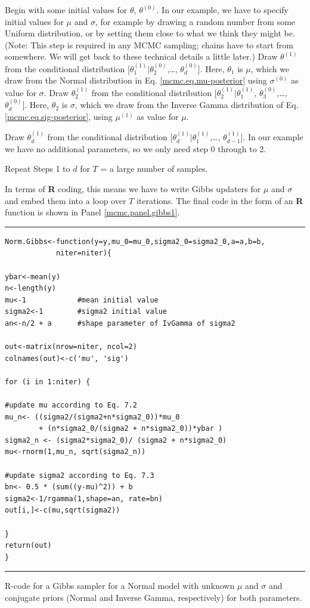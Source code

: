 { Begin with some initial values for $\theta$, $\theta^{(0)}$.}
In our example, we have to specify initial values for $\mu$ and $\sigma$, for
example by drawing a random number from some Uniform distribution, or
by setting them close to what we think they might be. (Note: This step
is required in any MCMC sampling; chains have to start from
somewhere. We will get back to these technical details a little
later.)
{ Draw $\theta^{(1)}$ from the conditional distribution $[\theta_{1}^{(1)}|\theta_{2}^{(0)}$,\ldots, $\theta_{d}^{(0)}]$. }
Here, $\theta_1$ is $\mu$, which we draw from the Normal distribution in Eq. \ref{mcmc.eq.mu-posterior}  using $\sigma^{(0)}$ as value for $\sigma$.
{ Draw $\theta_{2}^{(1)}$ from the conditional distribution $[\theta_{2}^{(1)}|\theta_{1}^{(1)}$, $\theta_{3}^{(0)}$,\ldots, $\theta_{d}^{(0)}]$. }
Here, $\theta_2$ is $\sigma$, which we draw from the Inverse Gamma
distribution of Eq. \ref{mcmc.eq.sig-posterior}, using $\mu^{(1)}$ as value for $\mu$.

{ Draw $\theta_{d}^{(1)}$ from the conditional distribution $[\theta_{d}^{(1)}|\theta_{1}^{(1)}$,\ldots, $\theta_{d-1}^{(1)}]$. }
In our example we have no additional parameters, so we only need step 0 through to 2.

{\flushleft Repeat Steps 1 to $d$ for $T$ = a large number of samples.}

In terms of {\bf R} coding, this means we have to write Gibbs updaters for
$\mu$ and $\sigma$ and embed them into a loop over $T$ iterations. The final
code in the form of an {\bf R} function is shown 
in Panel \ref{mcmc.panel.gibbs1}.


\begin{panel}[htp]
\centering
\rule[0.15in]{\textwidth}{.03in}
\begin{verbatim}
Norm.Gibbs<-function(y=y,mu_0=mu_0,sigma2_0=sigma2_0,a=a,b=b,
			niter=niter){

ybar<-mean(y)
n<-length(y)
mu<-1            #mean initial value
sigma2<-1        #sigma2 initial value
an<-n/2 + a      #shape parameter of IvGamma of sigma2

out<-matrix(nrow=niter, ncol=2)
colnames(out)<-c('mu', 'sig')

for (i in 1:niter) {

#update mu according to Eq. 7.2
mu_n<- ((sigma2/(sigma2+n*sigma2_0))*mu_0 
		+ (n*sigma2_0/(sigma2 + n*sigma2_0))*ybar )
sigma2_n <- (sigma2*sigma2_0)/ (sigma2 + n*sigma2_0)
mu<-rnorm(1,mu_n, sqrt(sigma2_n))

#update sigma2 according to Eq. 7.3
bn<- 0.5 * (sum((y-mu)^2)) + b
sigma2<-1/rgamma(1,shape=an, rate=bn)
out[i,]<-c(mu,sqrt(sigma2))

}
return(out)
}
\end{verbatim}
\rule[-0.15in]{\textwidth}{.03in}
\caption{
R-code for a Gibbs sampler for a Normal model with unknown $\mu$
and $\sigma$ and conjugate priors (Normal and Inverse Gamma, respectively) 
for both parameters.
}
\label{mcmc.panel.gibbs1}
\end{panel}

